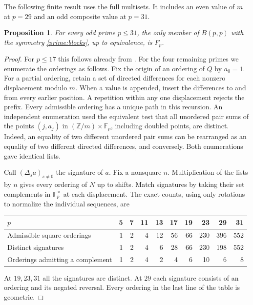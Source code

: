 \documentclass[11pt,a4paper]{article}
\newtheorem{proposition}[theorem]{Proposition}
\numberwithin{equation}{section}
\begin{document}
\medskip
The following finite result uses the full multisets. It includes an even value of $m$ at $p=29$ and an odd composite value at $p=31$.

\begin{proposition}\label{prime:finiteorder}
For every odd prime $p\le31$, the only member of $B(p,p)$ with the symmetry \eqref{prime:blocks}, up to equivalence, is $F_p$.
\end{proposition}
\begin{proof}
For $p\le17$ this follows already from \cite{hkm}. For the four remaining primes we enumerate the orderings as follows. Fix the origin of an ordering of $Q$ by $a_0=1$. For a partial ordering, retain a set of directed differences for each nonzero displacement modulo $m$. When a value is appended, insert the differences to and from every earlier position. A repetition within any one displacement rejects the prefix. Every admissible ordering has a unique path in this recursion. An independent enumeration used the equivalent test that all unordered pair sums of the points $(j,a_j)$ in $(\mathbb Z/m)\times\mathbb F_p$, including doubled points, are distinct. Indeed, an equality of two different unordered pair sums can be rearranged as an equality of two different directed differences, and conversely. Both enumerations gave identical lists.

Call $(\Delta_s a)_{s\ne0}$ the signature of $a$. Fix a nonsquare $n$. Multiplication of the lists by $n$ gives every ordering of $N$ up to shifts. Match signatures by taking their set complements in $\mathbb F_p^\times$ at each displacement. The exact counts, using only rotations to normalize the individual sequences, are
\begin{center}
\small
\begin{tabular}{lrrrrrrrrr}
\toprule
$p$ &5&7&11&13&17&19&23&29&31\\
\midrule
Admissible square orderings &1&2&4&12&56&66&230&396&552\\
Distinct signatures &1&2&4&6&28&66&230&198&552\\
Orderings admitting a complement &1&2&4&2&4&6&10&6&8\\
\bottomrule
\end{tabular}
\end{center}
At $19,23,31$ all the signatures are distinct. At $29$ each signature consists of an ordering and its negated reversal. Every ordering in the last line of the table is geometric.


\end{proof}
\end{document}
